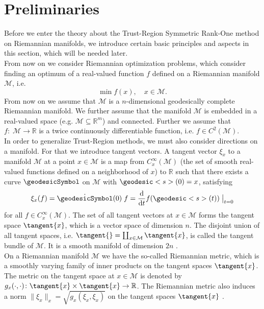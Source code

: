 \section{Preliminaries}

Before we enter the theory about the Trust-Region Symmetric Rank-One method on Riemannian manifolds, we introduce certain basic principles and aspects in this section, which will be needed later. \\

From now on we consider Riemannian optimization problems, which consider finding an optimum of a real-valued function $f$ defined on a Riemannian manifold $\mathcal{M}$, i.e.
\begin{equation*}
    \min f(x), \quad x \in \mathcal{M}.
\end{equation*}
From now on we assume that $\mathcal{M}$ is a $n$-dimensional geodesically complete Riemannian manifold. We further assume that the manifold $\mathcal{M}$ is embedded in a real-valued space (e.g. $\mathcal{M} \subseteq \mathbb{R}^m$) and connected. Further we assume that $f \colon \; \mathcal{M} \to \mathbb{R}$ is a twice continuously differentiable function, i.e. $f \in C^2(\mathcal{M})$. \\
In order to generalize Trust-Region methods, we must also consider directions on a manifold. For that we introduce tangent vectors. A tangent vector $\xi_x$ to a manifold $\mathcal{M}$ at a point $x \in \mathcal{M}$ is a map from $C^{\infty}_x(\mathcal{M})$ (the set of smooth real-valued functions defined on a neighborhood of $x$) to $\mathbb{R}$ such that there exists a curve $\geodesicSymbol$ on $\mathcal{M}$ with $\geodesic<s>(0) = x$, satisfying
\begin{equation*}
    \xi_x (f) = \dot{\geodesicSymbol}(0) \; f = \frac{\mathrm{d}}{\mathrm{d}t} f(\geodesic<s>(t)) \; \big{\vert}_{t=0}
\end{equation*}
for all $f \in C^{\infty}_x(\mathcal{M})$. The set of all tangent vectors at $x \in \mathcal{M}$ forms the tangent space $\tangent{x}$, which is a vector space of dimension $n$. The disjoint union of all tangent spaces, i.e. $\tangent{} = \coprod_{x \in \mathcal{M}} \tangent{x}$, is called the tangent bundle of $\mathcal{M}$. It is a smooth manifold of dimension $2n$ \cite[p.~33-36]{AbsilMahonySepulchre:2008}. \\
On a Riemannian manifold $\mathcal{M}$ we have the so-called Riemannian metric, which is a smoothly varying family of inner products on the tangent spaces $\tangent{x}$. The metric on the tangent space at $x \in \mathcal{M}$ is denoted by $g_x(\cdot, \cdot) \colon \tangent{x} \times \tangent{x} \to \mathbb{R}$. The Riemannian metric also induces a norm $\lVert \xi_x \rVert_x = \sqrt{g_x(\xi_x, \xi_x)}$ on the tangent spaces $\tangent{x}$ \cite[p.~45]{AbsilMahonySepulchre:2008}. \\
